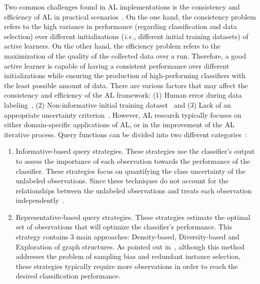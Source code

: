 \documentclass[parskip=full]{scrartcl}
\begin{document}
Two common challenges found in AL implementations is the consistency and
efficiency of AL in practical scenarios~\cite{Kottke2017}. On the one hand,
the consistency problem refers to the high variance in performance (regarding
classification and data selection) over different initializations
(\textit{i.e.,} different initial training datasets) of active learners. On
the other hand, the efficiency problem refers to the maximization of the
quality of the collected data over a run. Therefore, a good active learner is
capable of having a consistent performance over different initializations
while ensuring the production of high-performing classifiers with the least
possible amount of data. There are various factors that may affect the
consistency and efficiency of the AL framework: (1) Human error during data
labeling~\cite{Li2020}, (2) Non-informative initial training
dataset~\cite{Nguyen2004} and (3) Lack of an appropriate uncertainty
criterion~\cite{Rosario2020}. However, AL research typically focuses on either
domain-specific applications of AL, or in the improvement of the AL iterative
process. Query functions can be divided into two different
categories~\cite{Gu2021, Kumar2020}: 

\begin{enumerate}

    \item Informative-based query strategies. These strategies use the
        classifier's output to assess the importance of each observation
        towards the performance of the classifier. These strategies focus on
        quantifying the class uncertainty of the unlabeled observations.
        Since these techniques do not account for the relationships between
        the unlabeled observations and treats each observation
        independently~\cite{Fu2013}.

    \item Representative-based query strategies. These strategies estimate the
        optimal set of observations that will optimize the classifier's
        performance. This strategy contains 3 main approaches: Density-based,
        Diversity-based and Exploration of graph structures. As pointed out
        in~\cite{Kumar2020}, although this method addresses the problem of
        sampling bias and redundant instance selection, these strategies
        typically require more observations in order to reach the desired
        classification performance.

\end{enumerate}
\end{document}
